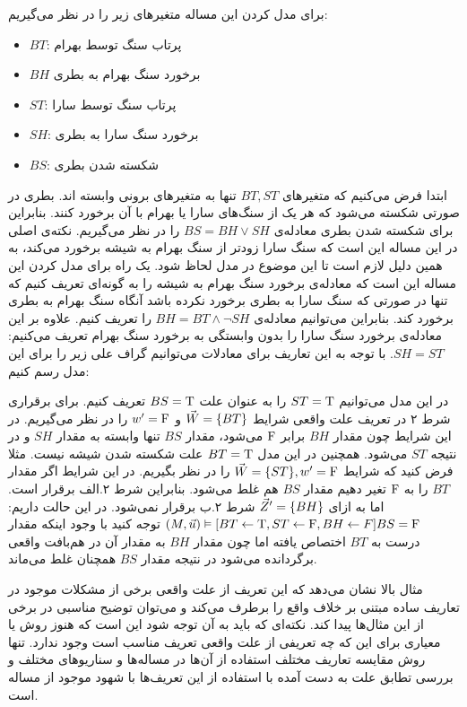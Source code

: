 برای مدل کردن این مساله متغیر‌های زیر را در نظر می‌گیریم:
\begin{itemize}
    \item $BT$:
          پرتاب سنگ توسط بهرام
    \item $BH$
          برخورد سنگ بهرام به بطری
    \item $ST$:
          پرتاب سنگ توسط سارا
    \item $SH$:
          برخورد سنگ سارا به بطری
    \item $BS$:
          شکسته شدن بطری
\end{itemize}
ابتدا فرض می‌کنیم که متغیر‌های
$BT,ST$
تنها به متغیر‌های برونی وابسته اند.
بطری در صورتی شکسته می‌شود که هر یک از سنگ‌های سارا یا بهرام با آن برخورد کنند.
بنابراین برای شکسته شدن بطری معادله‌ی
$BS = BH \vee SH$
را در نظر می‌گیریم.
نکته‌ی اصلی در این مساله این است که سنگ سارا زودتر از سنگ بهرام به شیشه برخورد می‌کند، به همین دلیل لازم است تا این موضوع در مدل لحاظ شود.
یک راه برای مدل کردن این مساله این است که معادله‌ی برخورد سنگ بهرام به شیشه را به گونه‌ای تعریف کنیم که تنها در صورتی که سنگ سارا به بطری برخورد نکرده باشد آنگاه سنگ بهرام به بطری برخورد کند.
بنابراین می‌توانیم معادله‌ی
$BH = BT \wedge \neg SH$
را تعریف کنیم.
علاوه بر این معادله‌ی برخورد سنگ سارا را بدون وابستگی به برخورد سنگ بهرام تعریف می‌کنیم:
$SH = ST$.
با توجه به این تعاریف برای معادلات می‌توانیم گراف علی زیر را برای این مدل رسم کنیم:

\begin{center}
\end{center}
در این مدل می‌توانیم 
$ST = \mathrm{T}$
را به عنوان علت 
$BS = \mathrm{T}$
تعریف کنیم.
برای برقراری شرط ۲ در تعریف علت واقعی شرایط
$\vec W = \{BT\}$
و 
$w' = \mathrm{F}$
را در نظر می‌گیریم.
در این شرایط چون مقدار 
$BH$
برابر 
$\mathrm{F}$
می‌شود، مقدار 
$BS$
تنها وابسته به مقدار 
$SH$
و در نتیجه 
$ST$
می‌شود.
همچنین در این مدل 
$BT = \mathrm{T}$
علت شکسته شدن شیشه نیست.
مثلا فرض کنید که شرایط 
$\vec W = \{ST\},w' = \mathrm{F}$ 
را در نظر بگیریم.
در این شرایط اگر مقدار 
$BT$
را به 
$\mathrm{F}$
تغیر دهیم مقدار 
$BS$
هم غلط می‌شود.
بنابراین شرط ۲.الف برقرار است.
اما به ازای 
$\vec Z' = \{BH\}$
شرط ۲.ب برقرار نمی‌شود.
در این حالت داریم:
$(M,\vec{u})\vDash[BT \leftarrow \mathrm{T},ST \leftarrow \mathrm{F},BH \leftarrow F]BS = \mathrm{F}$
توجه کنید با وجود اینکه مقدار درست به
$BT$
اختصاص یافته اما چون مقدار  
$BH$
به مقدار آن در هم‌بافت واقعی برگردانده می‌شود در نتیجه مقدار 
$BS$
همچنان غلط می‌ماند.

مثال بالا نشان می‌دهد که این تعریف از علت واقعی برخی از مشکلات موجود در تعاریف ساده مبتنی بر خلاف واقع را برطرف می‌کند و می‌توان توضیح مناسبی در برخی از این مثال‌ها پیدا کند.
نکته‌ای که باید به آن توجه شود این است که هنوز روش یا معیاری برای این که چه تعریفی از علت واقعی تعریف مناسب است وجود ندارد.
تنها روش مقایسه تعاریف مختلف استفاده از آن‌ها در مساله‌ها و سناریوهای مختلف و بررسی تطابق علت به دست آمده با استفاده از این تعریف‌ها با شهود موجود از مساله است.
